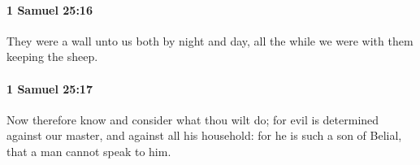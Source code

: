 		\paragraph{1 Samuel 25:16} %
			\label{1SAMUEL-25-16}

			They were a wall unto us both by night and day, all the while we were with them keeping the sheep.


		\paragraph{1 Samuel 25:17} %
			\label{1SAMUEL-25-17}

			Now therefore know and consider what thou wilt do; for evil is determined against our master, and against all his household: for he is such a son of Belial, that a man cannot speak to him.



